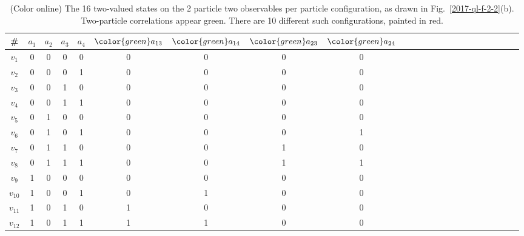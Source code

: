  \begin{table}%
 \begin{center}
 \caption{\label{2017-CHSH-tvs} (Color online) The 16 two-valued states on the 2 particle two observables per particle configuration,
as drawn in Fig.~\ref{2017-ql-f-2-2}(b).
Two-particle correlations appear {\color{green} green}. There are 10 different such configurations, painted in {\color{red}  red}.}
 \begin{tabular}{ccccccccccccccccccccccc}
\hline\hline
\# &$a_1$&$a_2$&$a_3$&$a_4$&${\color{green}  a_{13}}$&${\color{green}  a_{14}}$&${\color{green}  a_{23}}$&${\color{green}  a_{24}}$\\
\hline
$v_1   $&0  &  0 &   0 &   0  & {\color{red}  0}&   {\color{red}  0} &  {\color{red}  0}  &  {\color{red}  0}\\
$v_2   $&0  &  0 &   0 &   1  & {\color{green}  0}&   {\color{green}  0} &  {\color{green}   0}  &  {\color{green}  0}\\
$v_3   $&0  &  0 &   1 &   0  & {\color{green}  0}&   {\color{green}  0} &  {\color{green}   0}  &  {\color{green}  0}\\
$v_4   $&0  &  0 &   1 &   1  & {\color{green}  0}&   {\color{green}  0} &  {\color{green}   0}  &  {\color{green}  0}\\
$v_5   $&0  &  1 &   0 &   0  & {\color{green}  0}&   {\color{green}  0} &  {\color{green}   0}  &  {\color{green}  0}\\
$v_6   $&0  &  1 &   0 &   1  & {\color{red}  0}&   {\color{red}  0} &  {\color{red}  0}  &  {\color{red}  1}\\
$v_7   $&0  &  1 &   1 &   0  & {\color{red}  0}&   {\color{red}  0} &  {\color{red}  1}  &  {\color{red}  0}\\
$v_8   $&0  &  1 &   1 &   1  & {\color{red}  0}&   {\color{red}  0} &  {\color{red}  1}  &  {\color{red}  1}\\
$v_9   $&1  &  0 &   0 &   0  & {\color{green}  0}&   {\color{green}  0} &  {\color{green}   0}  &  {\color{green}  0}\\
$v_{10}$&1  &  0 &   0 &   1  & {\color{red}  0}&   {\color{red}  1} &  {\color{red}  0}  &  {\color{red}  0}\\
$v_{11}$&1  &  0 &   1 &   0  & {\color{red}  1}&   {\color{red}  0} &  {\color{red}  0}  &  {\color{red}  0}\\
$v_{12}$&1  &  0 &   1 &   1  & {\color{red}  1}&   {\color{red}  1} &  {\color{red}  0}  &  {\color{red}  0}\\

\end{tabular}
\end{center}
\end{table}
